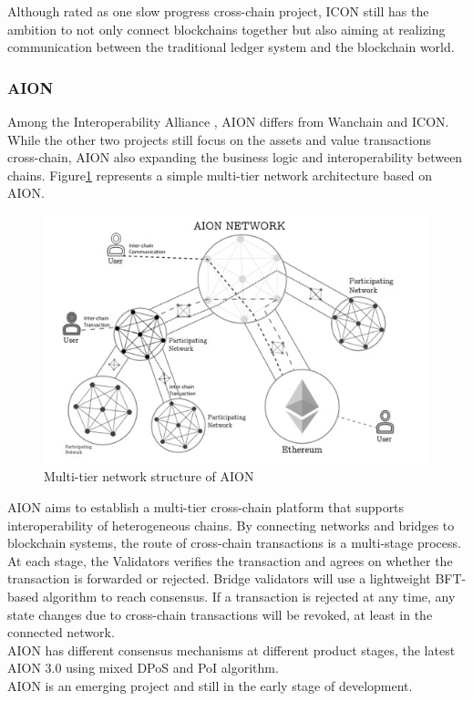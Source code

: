 \noindent Although rated as one slow progress cross-chain project, ICON still has the ambition to not only connect blockchains together but also aiming at realizing communication between the traditional ledger system and the blockchain world.


\subsubsection{AION}
\noindent Among the Interoperability Alliance\protect\footnotemark
, AION differs from Wanchain and ICON. While the other two projects still focus on the assets and value transactions cross-chain, AION also expanding the business logic and interoperability between chains. Figure\ref{fig:aion} represents a simple multi-tier network architecture based on AION.
        \begin{figure}[H]
        \includegraphics[width=1\textwidth]{./figures/aion.jpg}
        \centering
        \caption{{Multi-tier network structure of AION}\protect\footnotemark}
        \centering
        \label{fig:aion}
        
        \end{figure}
\noindent AION aims to establish a multi-tier cross-chain platform that supports interoperability of heterogeneous chains. By connecting networks and bridges to blockchain systems, the route of cross-chain transactions is a multi-stage process. \\
\noindent At each stage, the Validators verifies the transaction and agrees on whether the transaction is forwarded or rejected. Bridge validators will use a lightweight BFT-based algorithm to reach consensus. If a transaction is rejected at any time, any state changes due to cross-chain transactions will be revoked, at least in the connected network.\\
\noindent AION has different consensus mechanisms at different product stages, the latest AION 3.0 using mixed DPoS and PoI algorithm.\\
\noindent AION is an emerging project and still in the early stage of development.

